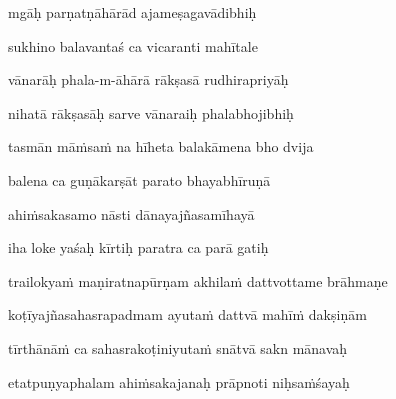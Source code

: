 mgāḥ parṇatṇāhārād ajameṣagavādibhiḥ\thinspace{\dandab} \dontdisplaylinenum

sukhino balavantaś ca vicaranti mahītale \veg\dontdisplaylinenum
{}

vānarāḥ phala-m-āhārā rākṣasā rudhirapriyāḥ\thinspace{\dandab} \dontdisplaylinenum

nihatā rākṣasāḥ sarve vānaraiḥ phalabhojibhiḥ \veg\dontdisplaylinenum
{}

tasmān māṁsaṁ na hīheta balakāmena bho dvija\thinspace{\dandab} \dontdisplaylinenum

balena ca guṇākarṣāt parato bhayabhīruṇā \veg\dontdisplaylinenum
{}

ahiṁsakasamo nāsti dānayajñasamīhayā\thinspace{\dandab} \dontdisplaylinenum

iha loke yaśaḥ kīrtiḥ paratra ca parā gatiḥ \veg\dontdisplaylinenum
{}

\ujvers\nemsloka 
trailokyaṁ maṇiratnapūrṇam akhilaṁ dattvottame brāhmaṇe
\dontdisplaylinenum

\nemslokab 
koṭīyajñasahasrapadmam ayutaṁ dattvā mahīṁ dakṣiṇām \danda\dontdisplaylinenum

\nemslokac 
tīrthānāṁ ca sahasrakoṭiniyutaṁ snātvā sakn mānavaḥ
\dontdisplaylinenum

\nemslokad 
etatpuṇyaphalam ahiṁsakajanaḥ prāpnoti niḥsaṁśayaḥ \veg\dontdisplaylinenum

\vers


